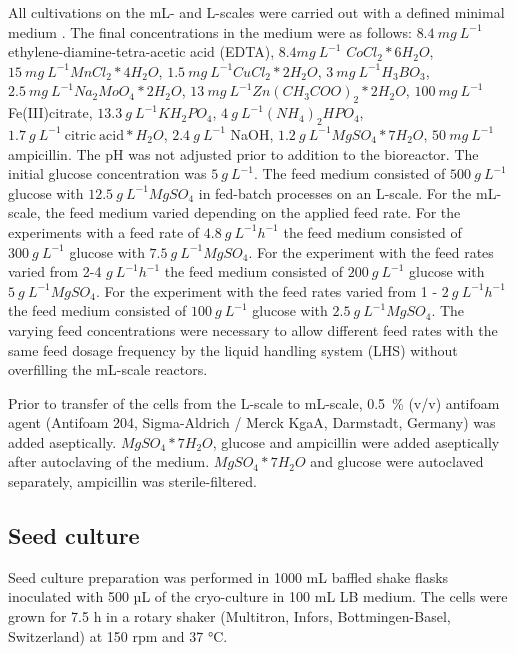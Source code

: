 \documentclass[sn-standardnature]{sn-jnl}%
\theoremstyle{thmstyleone}%
\theoremstyle{thmstyletwo}%
\theoremstyle{thmstylethree}%
\begin{document}
All cultivations on the mL- and L-scales were carried out with a defined minimal medium \cite{riesenberg1991high}.
The final concentrations in the medium were as follows:
$8.4\ mg\ L^{-1}$ ethylene-diamine-tetra-acetic acid (EDTA), $8.4 mg\ L^{-1}$ $CoCl_{2}*6H_{2}O$, $15\ mg\ L^{-1} MnCl_{2}*4H_{2}O$, $1.5\ mg\ L^{-1} CuCl_{2}*2H_{2}O$, $3\ mg\ L^{-1} H_{3}BO_{3}$, $2.5\ mg\ L^{-1} Na_{2}MoO_{4}*2H_{2}O$, $13\ mg\ L^{-1} Zn(CH_{3}COO)_{2}*2H_{2}O$, $100\ mg\ L^{-1}$ Fe(III)citrate, $13.3\ g\ L^{-1} KH_{2}PO_{4}$, $4\ g\ L^{-1} (NH_{4})_{2}HPO_{4}$, $1.7\ g\ L^{-1}\ \mathrm{citric\ acid}*H_{2}O$, $2.4\ g\ L^{-1}$ NaOH, $1.2\ g\ L^{-1} MgSO_{4}*7H_{2}O$, $50\ mg\ L^{-1}$ ampicillin.
The pH was not adjusted prior to addition to the bioreactor.
The initial glucose concentration was $5\ g\ L^{-1}$.
The feed medium consisted of $500\ g\ L^{-1}$ glucose with $12.5\ g\ L^{-1} MgSO_{4}$ in fed-batch processes on an L-scale.
For the mL-scale, the feed medium varied depending on the applied feed rate.
For the experiments with a feed rate of $4.8\ g\ L^{-1} h^{-1}$ the feed medium consisted of $300\ g\ L^{-1}$ glucose with $7.5\ g\ L^{-1} MgSO_{4}$.
For the experiment with the feed rates varied from 2-4 $g\ L^{-1}h^{-1}$ the feed medium consisted of $200\ g\ L^{-1}$ glucose with $5\ g\ L^{-1} MgSO_{4}$.
For the experiment with the feed rates varied from 1 - $2\ g\ L^{-1} h^{-1}$ the feed medium consisted of $100\ g\ L ^{-1}$ glucose with $2.5\ g\ L^{-1} MgSO_{4}$.
The varying feed concentrations were necessary to allow different feed rates with the same feed dosage frequency by the liquid handling system (LHS) without overfilling the mL-scale reactors.

Prior to transfer of the cells from the L-scale to mL-scale, 0.5~\% (v/v) antifoam agent (Antifoam 204, Sigma-Aldrich / Merck KgaA, Darmstadt, Germany) was added aseptically.
$MgSO_{4}*7H_{2}O$, glucose and ampicillin were added aseptically after autoclaving of the medium.
$MgSO_{4}*7H_{2}O$ and glucose were autoclaved separately, ampicillin was sterile-filtered.

\subsection{Seed culture}
Seed culture preparation was performed in 1000 mL baffled shake flasks inoculated with 500 µL of the cryo-culture in 100 mL LB medium.
The cells were grown for 7.5 h in a rotary shaker (Multitron, Infors, Bottmingen-Basel, Switzerland) at 150 rpm and 37 °C.
\end{document}
